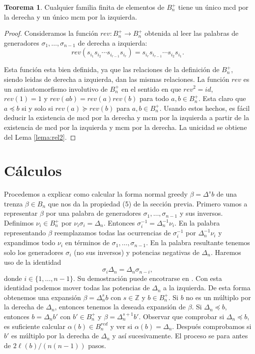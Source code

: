 \documentclass[12pt]{book}
\theoremstyle{definition}
\newtheorem{teor}{Teorema}[section]
\begin{document}
\begin{teor}
Cualquier familia finita de elementos de $B_n^+$ tiene un único mcd por la derecha y un único mcm por la izquierda.
\end{teor}
\begin{proof} Consideramos la función $rev: B_n^+\rightarrow B_n^+$ obtenida al leer las palabras de generadores $\sigma_1,\ldots, \sigma_{n-1}$ de derecha a izquierda:
$$rev(s_{i_1}s_{i_2}\cdots s_{i_{r-1}}s_{i_r})=s_{i_r}s_{i_{r-1}}\cdots s_{i_{2}}s_{i_1}.$$

Esta función esta bien definida, ya que las relaciones de la definición de $B_n^+$, siendo leidas de derecha a izquierda, dan las mismas relaciones. La función $rev$ es un antiautomorfismo involutivo de $B_n^+$ en el sentido en que $rev^2=id$, $rev(1)=1$ y $rev(ab)=rev(a)rev(b)$ para todo $a,b\in B_n^+$. Esta claro que $a\preceq b$ si y solo si $rev(a)\succeq rev(b)$ para $a,b\in B_n^+$. Usando estos hechos, es fácil deducir la existencia de mcd por la derecha y mcm por la izquierda a partir de la existencia de mcd por la izquierda y mcm por la derecha. La unicidad se obtiene del Lema \ref{lema:rel2}.
\end{proof}

\section{Cálculos}

Procedemos a explicar como calcular la forma normal greedy $\beta=\Delta^sb$ de una trenza $\beta\in B_n$ que nos da la propiedad (5) de la sección previa. Primero vamos a representar $\beta$ por una palabra de generadores $\sigma_1,\ldots,\sigma_{n-1}$ y sus inversos. Definimos $\nu_i\in B_n^+$ por $\nu_i\sigma_i=\Delta_n$. Entonces $\sigma_i^{-1}=\Delta_n^{-1}\nu_i$. En la palabra representando $\beta$ reemplazamos todas las ocurrencias de $\sigma_i^{-1}$ por $\Delta_n^{-1}\nu_i$ y expandimos todo $\nu_i$ en términos de $\sigma_1,\ldots,\sigma_{n-1}$. En la palabra resultante tenemos solo los generadores $\sigma_i$ (no sus inversos) y potencias negativas de $\Delta_n$. Haremos uso de la identidad
\begin{equation}
\sigma_i\Delta_n=\Delta_n\sigma_{n-i},
\end{equation}
donde $i\in\{1,\ldots,n-1\}$. Su demostración puede encotrarse en \cite{br_gr}. Con esta identidad podemos mover todas las potencias de $\Delta_n$ a la izquierda. De esta forma obtenemos una expansión $\beta=\Delta_n^sb$ con $s\in\mathbb{Z}$ y $b\in B_n^+$. Si $b$ no es un múltiplo por la derecha de $\Delta_n$, entonces tenemos la deseada expansión de $\beta$. Si $\Delta_n\preceq b$, entonces $b=\Delta_n b'$ con $b'\in B_n^+$ y $\beta=\Delta_n^{s+1}b'$. Observar que comprobar si $\Delta_n\preceq b$, es suficiente calcular $\alpha(b)\in B_n^{red}$ y ver si $\alpha(b)=\Delta_n$. Después comprobamos si $b'$ es múltiplo por la derecha de $\Delta_n$ y así sucesivamente. El proceso se para antes de $2\ell(b)/(n(n-1))$ pasos.
\end{document}
